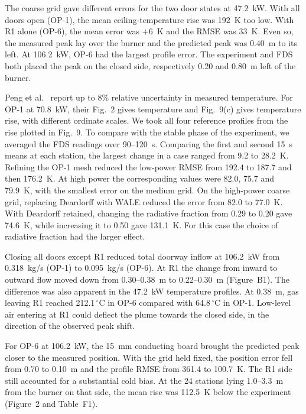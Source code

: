 The coarse grid gave different errors for the two door states at 47.2~kW. With all doors open (OP-1), the mean ceiling-temperature rise was 192~K too low. With R1 alone (OP-6), the mean error was $+6$~K and the RMSE was 33~K. Even so, the measured peak lay over the burner and the predicted peak was 0.40~m to its left. At 106.2~kW, OP-6 had the largest profile error. The experiment and FDS both placed the peak on the closed side, respectively 0.20 and 0.80~m left of the burner.

Peng et al.~\cite{peng} report up to 8\% relative uncertainty in measured temperature. For OP-1 at 70.8~kW, their Fig.~2 gives temperature and Fig.~9(c) gives temperature rise, with different ordinate scales. We took all four reference profiles from the rise plotted in Fig.~9. To compare with the stable phase of the experiment, we averaged the FDS readings over 90--120~s. Comparing the first and second 15~s means at each station, the largest change in a case ranged from 9.2 to 28.2~K.
Refining the OP-1 mesh reduced the low-power RMSE from 192.4 to 187.7 and then 176.2~K. At high power the corresponding values were 82.0, 75.7 and 79.9~K, with the smallest error on the medium grid. On the high-power coarse grid, replacing Deardorff with WALE reduced the error from 82.0 to 77.0~K. With Deardorff retained, changing the radiative fraction from 0.29 to 0.20 gave 74.6~K, while increasing it to 0.50 gave 131.1~K. For this case the choice of radiative fraction had the larger effect.

\clearpage
{}
Closing all doors except R1 reduced total doorway inflow at 106.2~kW from 0.318~kg/s (OP-1) to 0.095~kg/s (OP-6). At R1 the change from inward to outward flow moved down from 0.30--0.38~m to 0.22--0.30~m (Figure~B1). The difference was also apparent in the 47.2~kW temperature profiles. At 0.38~m, gas leaving R1 reached 212.1$\,^{\circ}$C in OP-6 compared with 64.8$\,^{\circ}$C in OP-1. Low-level air entering at R1 could deflect the plume towards the closed side, in the direction of the observed peak shift.

For OP-6 at 106.2~kW, the 15~mm conducting board brought the predicted peak closer to the measured position. With the grid held fixed, the position error fell from 0.70 to 0.10~m and the profile RMSE from 361.4 to 100.7~K. The R1 side still accounted for a substantial cold bias. At the 24 stations lying 1.0--3.3~m from the burner on that side, the mean rise was 112.5~K below the experiment (Figure~2 and Table~F1).

